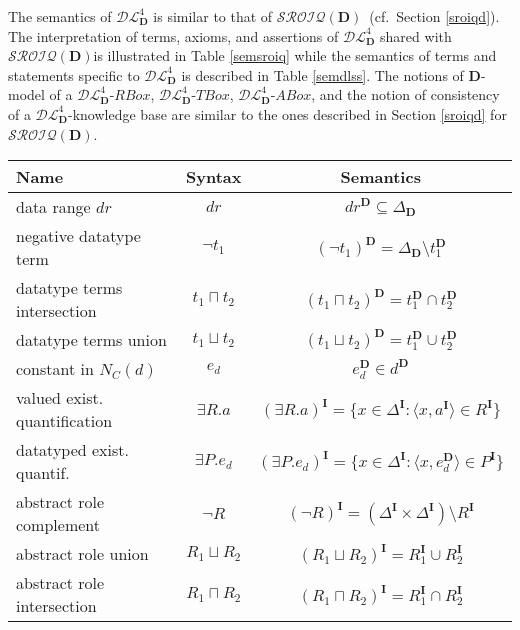 \documentclass[a4paper]{llncs}
\newcommand{\shdlss}{\mathcal{DL}_{\D}^{4}}
\newcommand{\sroiqd}{\ensuremath{\mathcal{SROIQ}(\D)}}
\newcommand{\I}{\mathbf{I}}
\newcommand{\D}{\mathbf{D}}
\begin{document}
The semantics of $\shdlss$ is similar to that of \sroiqd\ (cf.\  Section \ref{sroiqd}). The interpretation of terms, axioms, and assertions of $\shdlss$ shared with \sroiqd\space is illustrated in Table \ref{semsroiq} while the semantics of terms and statements specific to $\shdlss$ is described in Table \ref{semdlss}. The notions of $\D$-model of a $\shdlss$-$RBox$, $\shdlss$-$TBox$, $\shdlss$-$ABox$, and the notion of consistency of a $\shdlss$-knowledge base are similar to the ones described in Section \ref{sroiqd} for \sroiqd.
{\small
\begin{longtable}{|>{\centering}m{4cm}|c|c|}
\hline
Name & Syntax & Semantics \\
\hline

data range $dr$ & $ dr $ & $  dr^{\D}\subseteq \Delta_{\D} $ \\

negative datatype term & $ \neg t_1 $ & $  (\neg t_1)^{\D} = \Delta_{\D} \setminus t_1^{\D}$ \\

datatype terms intersection & $ t_1 \sqcap t_2 $ & $  (t_1 \sqcap t_2)^{\D} = t_1^{\D} \cap t_2^{\D} $ \\

datatype terms union & $ t_1 \sqcup t_2 $ & $  (t_1 \sqcup t_2)^{\D} = t_1^{\D} \cup t_2^{\D} $ \\

constant in $N_{C}(d)$ & $ e_{d} $ & $ e_{d}^\D \in d^\D$ \\

\hline

valued exist. quantification & $\exists R.{a}$ & $(\exists R.{a})^\I = \{ x \in \Delta^\I : \langle x,a^\I \rangle \in R^\I  \}$ \\

datatyped exist. quantif. & $\exists P.{e_{d}}$ & $(\exists P.e_{d})^\I = \{ x \in \Delta^\I : \langle x, e^\D_{d} \rangle \in P^\I  \}$ \\

\hline

abstract role complement & $ \neg R $ & $ (\neg R)^\I=(\Delta^\I \times \Delta^\I) \setminus R^\I $\\

abstract role union & $R_1 \sqcup R_2$ & $ (R_1 \sqcup R_2)^\I = R_1^\I \cup R_2^\I $\\

abstract role intersection & $R_1 \sqcap R_2$ & $ (R_1 \sqcap R_2)^\I = R_1^\I \cap R_2^\I $\\


\end{longtable}}
\end{document}
